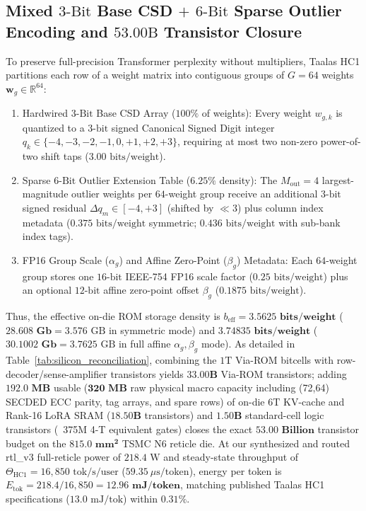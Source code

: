 \documentclass[10pt,journal,compsoc]{IEEEtran}
\def\texttt#1{#1}%
\def\textbf#1{#1}%
\begin{document}
\subsection{Mixed $3\text{-Bit}$ Base CSD $+$ $6\text{-Bit}$ Sparse Outlier Encoding and $53.00\text{B}$ Transistor Closure}
To preserve full-precision Transformer perplexity without multipliers, Taalas HC1 partitions each row of a weight matrix into contiguous groups of $G=64$ weights $\mathbf{w}_g \in \mathbb{R}^{64}$:
\begin{enumerate}
    \item \textbf{Hardwired $3\text{-Bit}$ Base CSD Array ($100\%$ of weights)}: Every weight $w_{g,k}$ is quantized to a $3\text{-bit}$ signed Canonical Signed Digit integer $q_k \in \{-4, -3, -2, -1, 0, +1, +2, +3\}$, requiring at most two non-zero power-of-two shift taps ($3.00\text{ bits/weight}$).
    \item \textbf{Sparse $6\text{-Bit}$ Outlier Extension Table ($6.25\%$ density)}: The $M_{\text{out}}=4$ largest-magnitude outlier weights per $64$-weight group receive an additional $3\text{-bit}$ signed residual $\Delta q_m \in [-4,+3]$ (shifted by $\ll 3$) plus column index metadata ($0.375\text{ bits/weight}$ symmetric; $0.436\text{ bits/weight}$ with sub-bank index tags).
    \item \textbf{\texttt{FP16} Group Scale ($\alpha_g$) and Affine Zero-Point ($\beta_g$) Metadata}: Each $64$-weight group stores one $16\text{-bit}$ IEEE-754 \texttt{FP16} scale factor ($0.25\text{ bits/weight}$) plus an optional $12\text{-bit}$ affine zero-point offset $\beta_g$ ($0.1875\text{ bits/weight}$).
\end{enumerate}
Thus, the effective on-die ROM storage density is $b_{\text{eff}} = \mathbf{3.5625\text{ bits/weight}}$ ($\mathbf{28.608\text{ Gb}} = 3.576\text{ GB}$ in symmetric mode) and $\mathbf{3.74835\text{ bits/weight}}$ ($\mathbf{30.1002\text{ Gb}} = 3.7625\text{ GB}$ in full affine $\alpha_g,\beta_g$ mode). As detailed in Table~\ref{tab:silicon_reconciliation}, combining the $1\text{T}$ Via-ROM bitcells with row-decoder/sense-amplifier transistors yields $\mathbf{33.00\text{B}}$ Via-ROM transistors; adding $\mathbf{192.0\text{ MB}}$ usable ($\mathbf{320\text{ MB}}$ raw physical macro capacity including \texttt{(72,64)} SECDED ECC parity, tag arrays, and spare rows) of on-die $6\text{T}$ KV-cache and Rank-16 LoRA SRAM ($\mathbf{18.50\text{B}}$ transistors) and $\mathbf{1.50\text{B}}$ standard-cell logic transistors (\texttt{~375M} 4-T equivalent gates) closes the exact $\mathbf{53.00\text{ Billion}}$ transistor budget on the $\mathbf{815.0\text{ mm}^2}$ TSMC N6 reticle die. At our synthesized and routed \texttt{rtl\_v3} full-reticle power of $218.4\text{ W}$ and steady-state throughput of $\Theta_{\text{HC1}} = 16,850\text{ tok/s/user}$ ($59.35\ \mu\text{s/token}$), energy per token is $E_{\text{tok}} = 218.4 / 16,850 = \mathbf{12.96\text{ mJ/token}}$, matching published Taalas HC1 specifications ($13.0\text{ mJ/tok}$) within $\mathbf{0.31\%}$.
\end{document}
